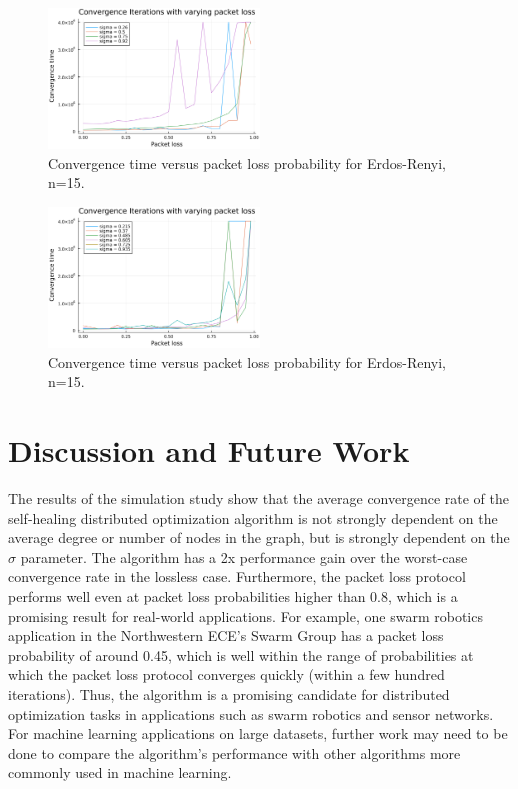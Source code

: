 \documentclass[conference]{IEEEtran}
\begin{document}
\begin {figure}[h]
    \centering
    \includegraphics[width=0.5\textwidth]{s-er-pl-time.png}
    \caption{Convergence time versus packet loss probability for Erdos-Renyi, n=15.}
    \label{fig:packet_loss_time}
\end{figure}

\begin {figure}[h]
    \centering
    \includegraphics[width=0.5\textwidth]{s-er-pl-time_v2.png}
    \caption{Convergence time versus packet loss probability for Erdos-Renyi, n=15.}
    \label{fig:packet_loss_time2}
\end{figure}

\section{Discussion and Future Work}

The results of the simulation study show that the average convergence rate of the self-healing distributed optimization algorithm is not strongly dependent on the average degree or number of nodes in the graph, but is strongly dependent on the $\sigma$ parameter.
The algorithm has a 2x performance gain over the worst-case convergence rate in the lossless case. Furthermore, the packet loss protocol 
performs well even at packet loss probabilities higher than 0.8, which is a promising result for real-world applications. For example, one swarm 
robotics application in the Northwestern ECE's Swarm Group has a packet loss probability of around 0.45, which is well within the range of probabilities at which 
the packet loss protocol converges quickly (within a few hundred iterations). Thus, the algorithm is a promising candidate for distributed optimization tasks
in applications such as swarm robotics and sensor networks. For machine learning applications on large datasets, further work may need to be done to compare
the algorithm's performance with other algorithms more commonly used in machine learning. 
\end{document}
